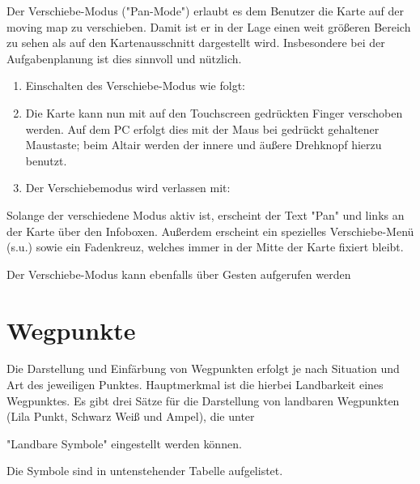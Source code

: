 Der Verschiebe-Modus ("Pan-Mode") erlaubt es dem Benutzer die Karte auf der moving map zu verschieben. Damit ist er in der Lage einen weit größeren Bereich zu sehen als auf den Kartenausschnitt dargestellt wird. Insbesondere bei der Aufgabenplanung ist dies sinnvoll und nützlich.
\begin{enumerate}
\item Einschalten des Verschiebe-Modus wie folgt:
\begin{quote}
\blink{}
\end{quote}
\item Die Karte kann nun mit auf den Touchscreen gedrückten Finger verschoben werden. Auf dem \textsf{PC}  erfolgt dies mit der Maus bei gedrückt gehaltener Maustaste; beim Altair werden der innere und äußere Drehknopf hierzu benutzt.
\item Der Verschiebemodus wird verlassen mit:
\begin{quote}
\end{quote}
\end{enumerate}

Solange der verschiedene Modus aktiv ist, erscheint der Text "Pan" und links an der Karte über den Infoboxen. Außerdem erscheint ein spezielles Verschiebe-Menü (s.u.) sowie ein Fadenkreuz, welches immer in der Mitte der Karte fixiert bleibt.

Der Verschiebe-Modus kann ebenfalls über Gesten aufgerufen werden 

\section{Wegpunkte} \label{sec:waypoint-schemes}
Die Darstellung und Einfärbung von Wegpunkten erfolgt je nach Situation und Art des jeweiligen Punktes. Hauptmerkmal ist die hierbei Landbarkeit eines Wegpunktes.  Es gibt drei Sätze für die Darstellung von landbaren Wegpunkten  (Lila Punkt, Schwarz Weiß und Ampel), die unter
\begin{quote}
\blink{}\blink{}\blink{}
\end{quote}  "Landbare Symbole" eingestellt werden können.

Die Symbole sind in untenstehender Tabelle aufgelistet. 

